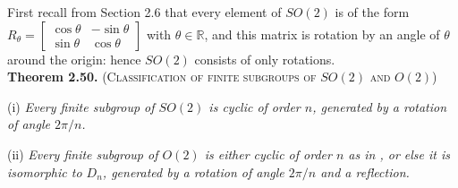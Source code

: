 \documentclass[leqno]{book}
\begin{document}
First recall from Section 2.6 that every element of $SO(2)$ is of the form $R_\theta=\begin{bmatrix}\cos\theta&-\sin\theta\\\sin\theta&\cos\theta\end{bmatrix}$ with $\theta\in\mathbb R$, and this matrix is rotation by an angle of $\theta$ around the origin: hence $SO(2)$ consists of only rotations.\\

\noindent\textbf{Theorem 2.50.} \textsc{(Classification of finite subgroups of $SO(2)$ and $O(2)$)}

(i) \emph{Every finite subgroup of $SO(2)$ is cyclic of order $n$, generated by a rotation of angle $2\pi/n$.}

(ii) \emph{Every finite subgroup of $O(2)$ is either cyclic of order $n$ as in , or else it is isomorphic to $D_n$, generated by a rotation of angle $2\pi/n$ and a reflection.}\\
\end{document}
